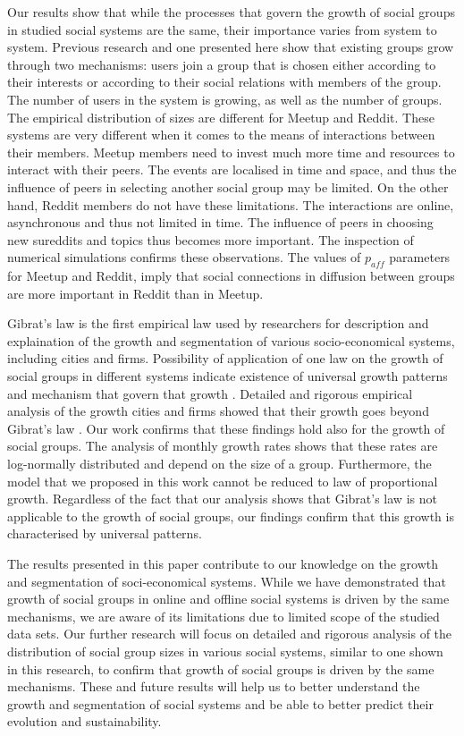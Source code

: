 Our results show that while the processes that govern the growth of social groups in studied social systems are the same, their importance varies from system to system. Previous research \cite{zheleva2009co} and one presented here show that existing groups grow through two mechanisms: users join a group that is chosen either according to their interests or according to their social relations with members of the group. The number of users in the system is growing, as well as the number of groups. The empirical distribution of sizes are different for Meetup and Reddit. These systems are very different when it comes to the means of interactions between their members. Meetup members need to invest much more time and resources to interact with their peers. The events are localised in time and space, and thus the influence of peers in selecting another social group may be limited. On the other hand, Reddit members do not have these limitations. The interactions are online, asynchronous and thus not limited in time. The influence of peers in choosing new sureddits and topics thus becomes more important. The inspection of numerical simulations confirms these observations. The values of $p_{aff}$ parameters for Meetup and Reddit, imply that social connections in diffusion between groups are more important in Reddit than in Meetup.   

Gibrat's law is the first empirical law used by researchers for description and explaination of the growth and segmentation of various socio-economical systems, including cities and firms. Possibility of application of one law on the growth of social groups in different systems indicate existence of universal growth patterns and mechanism that govern that growth \cite{}. Detailed and rigorous empirical analysis of the growth cities and firms showed that their growth goes beyond Gibrat's law \cite{}. Our work confirms that these findings hold also for the growth of social groups. The analysis of monthly growth rates shows that these rates are log-normally distributed and depend on the size of a group. Furthermore, the model that we proposed in this work cannot be reduced to law of  proportional growth. Regardless of the fact that our analysis shows that Gibrat's law is not applicable to the growth of social groups, our findings confirm that this growth is characterised by universal patterns. 

The results presented in this paper contribute to our knowledge on the growth and segmentation of soci-economical systems. While we have demonstrated that growth of social groups in online and offline social systems is driven by the same mechanisms, we are aware of its limitations due to limited scope of the studied data sets. Our further research will focus on detailed and rigorous analysis of the distribution of social group sizes in various social systems, similar to one shown in this research, to confirm that growth of social groups is driven by the same mechanisms. These and future results will help us to better understand the growth and segmentation of social systems and be able to better predict their evolution and sustainability.



